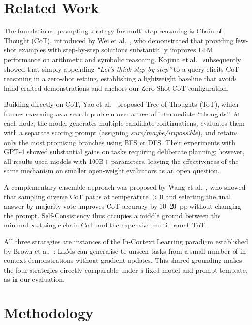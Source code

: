 ﻿\documentclass[runningheads]{llncs}
\begin{document}
\section{Related Work}
\label{sec:related}

The foundational prompting strategy for multi-step reasoning is
Chain-of-Thought (CoT), introduced by Wei et al.~\cite{wei2022cot},
who demonstrated that providing few-shot examples with step-by-step
solutions substantially improves LLM performance on arithmetic and
symbolic reasoning.
Kojima et al.~\cite{kojima2022zeroshot} subsequently showed that
simply appending \textit{``Let's think step by step''} to a query
elicits CoT reasoning in a zero-shot setting, establishing a
lightweight baseline that avoids hand-crafted demonstrations and
anchors our Zero-Shot CoT configuration.

Building directly on CoT, Yao et al.~\cite{yao2023tot} proposed
Tree-of-Thoughts (ToT), which frames reasoning as a search problem
over a tree of intermediate ``thoughts''.
At each node, the model generates multiple candidate continuations,
evaluates them with a separate scoring prompt (assigning
\textit{sure/maybe/impossible}), and retains only the most promising
branches using BFS or DFS.
Their experiments with GPT-4 showed substantial gains on tasks
requiring deliberate planning; however, all results used models with
100B+ parameters, leaving the effectiveness of the same mechanism on
smaller open-weight evaluators as an open question.

A complementary ensemble approach was proposed by Wang et
al.~\cite{wang2022selfconsistency}, who showed that sampling diverse
CoT paths at temperature $>0$ and selecting the final answer by
majority vote improves CoT accuracy by 10--20~pp without changing the
prompt.
Self-Consistency thus occupies a middle ground between the
minimal-cost single-chain CoT and the expensive multi-branch ToT.

All three strategies are instances of the In-Context Learning paradigm
established by Brown et al.~\cite{brown2020gpt3}: LLMs can generalise
to unseen tasks from a small number of in-context demonstrations
without gradient updates.
This shared grounding makes the four strategies directly comparable
under a fixed model and prompt template, as in our evaluation.

\section{Methodology}
\label{sec:method}
\end{document}
